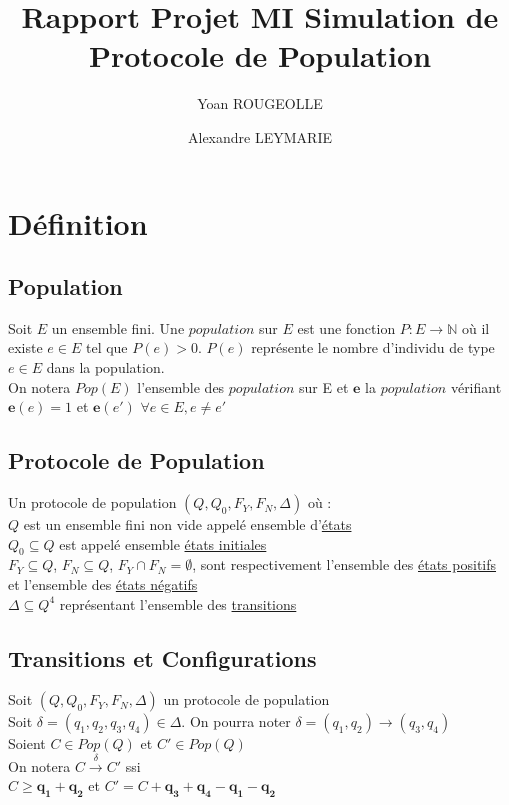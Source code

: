 \documentclass[a4paper,12pt]{report}
\title{Rapport Projet MI Simulation de Protocole de Population}
\author{Yoan ROUGEOLLE \and Alexandre LEYMARIE }
\date{}
\begin{document}
\maketitle

\section{Définition}

\subsection{Population}

Soit $E$ un ensemble fini. Une $population$ sur $E$ est une fonction $P: E \longrightarrow \mathbb{N}$ où il existe $e \in E$ tel que $P(e) > 0$. $P(e)$ représente le nombre d'individu de type $e \in E$ dans la population.\\
On notera $Pop(E)$ l'ensemble des $population$ sur E et $\boldsymbol{e}$  la $population$ vérifiant $\boldsymbol{e}(e) = 1$ et $\boldsymbol{e}(e')$ $\forall e \in E, e \ne e'$

\subsection{Protocole de Population}
Un protocole de population $(Q, Q_{0}, F_{Y}, F_{N},\Delta)$ où :\\
$Q$ est un ensemble fini non vide appelé ensemble d'\underline{états}\\
$Q_{0} \subseteq Q$ est appelé ensemble \underline{états initiales}\\
$F_{Y} \subseteq Q$, $F_{N} \subseteq Q$,  $F_{Y} \cap F_{N} = \emptyset$, sont respectivement l'ensemble des \underline{états positifs} et l'ensemble des \underline{états négatifs}\\
$\Delta \subseteq Q^{4}$ représentant l'ensemble des \underline{transitions}

\subsection{Transitions et Configurations}
Soit $(Q, Q_{0}, F_{Y}, F_{N},\Delta)$ un protocole de population\\
Soit $\delta=(q_{1},q_{2},q_{3},q_{4}) \in \Delta$. On pourra noter $\delta = (q_{1}, q_{2}) \rightarrow (q_{3},q_{4})$\\
Soient $C \in Pop(Q)$ et $C' \in Pop(Q)$\\
On notera $C \xrightarrow{\delta} C'$ ssi\\
$C \geq \boldsymbol{q_{1}} + \boldsymbol{q_{2}}$ et $C' = C + \boldsymbol{q_{3}} + \boldsymbol{q_{4}} - \boldsymbol{q_{1}} - \boldsymbol{q_{2}}$
\end{document}
